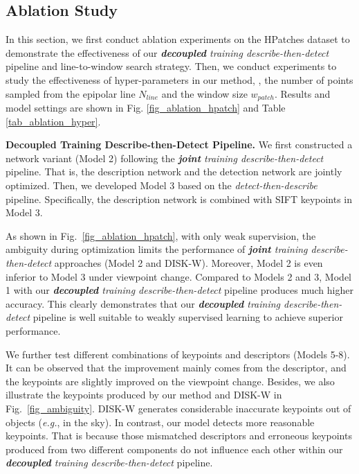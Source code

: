 \documentclass[10pt,twocolumn,letterpaper]{article}
\begin{document}
\subsection{Ablation Study}
In this section, we first conduct ablation experiments on the HPatches dataset  \cite{hpatches_2017_cvpr}  to demonstrate the effectiveness of our \textit{\textbf{decoupled} training describe-then-detect} pipeline and line-to-window search strategy. Then, we conduct experiments to study the effectiveness of hyper-parameters in our method, \ie, the number of points sampled from the epipolar line $N_{line}$ and the window size $w_{patch}$. Results and model settings are shown in Fig. \ref{fig_ablation_hpatch} and Table \ref{tab_ablation_hyper}. 

\noindent\textbf{\textbf{Decoupled} Training Describe-then-Detect Pipeline.}
\label{ablation_2stage}
We first constructed a network variant (Model 2)  following the \textit{\textbf{joint} training describe-then-detect} pipeline. That is, the description network and the detection network are jointly optimized. 
Then, we developed Model 3 based on the \textit{detect-then-describe} pipeline. Specifically, the description network is combined with SIFT keypoints in Model 3.

As shown in Fig.~\ref{fig_ablation_hpatch}, with only weak supervision, the ambiguity during optimization limits the performance of \textit{\textbf{joint} training  describe-then-detect} approaches (Model 2 and DISK-W). Moreover, Model 2 is even inferior to Model 3 under viewpoint change. 
Compared to Models 2 and 3, Model 1 with our \textit{\textbf{decoupled} training describe-then-detect} pipeline produces much higher accuracy. 
This clearly demonstrates that our \textit{\textbf{decoupled} training describe-then-detect} pipeline is well suitable to weakly supervised learning to achieve superior performance.

We further test different combinations of keypoints and descriptors (Models 5-8). It can be observed that the improvement mainly comes from the descriptor, and the keypoints are slightly improved on the viewpoint change. Besides, we also illustrate the keypoints produced by our method and DISK-W in Fig.~\ref{fig_ambiguity}. DISK-W generates considerable inaccurate keypoints out of objects (\emph{e.g.}, in the sky). In contrast, our model detects more reasonable keypoints. That is because those mismatched descriptors and erroneous keypoints produced from two different components do not influence each other within our \textit{\textbf{decoupled} training describe-then-detect} pipeline.
\end{document}
